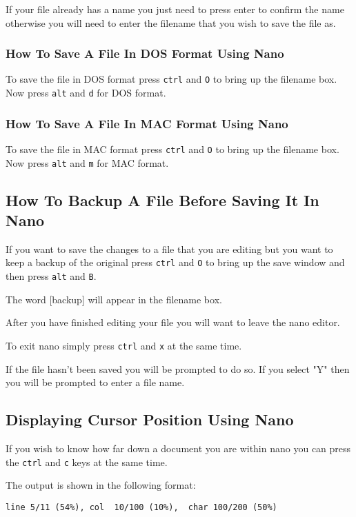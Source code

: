 If your file already has a name you just need to press enter to confirm the name otherwise you will
need to enter the filename that you wish to save the file as.

\subsubsection{How To Save A File In DOS Format Using Nano}
To save the file in DOS format press \texttt{ctrl}  and \texttt{O} to bring up the filename box. Now
press \texttt{alt} and \texttt{d} for DOS format.
\subsubsection{How To Save A File In MAC Format Using Nano}
To save the file in MAC format press \texttt{ctrl}  and \texttt{O} to bring up the filename box. Now
press \texttt{alt} and \texttt{m}  for MAC format.

\subsection{How To Backup A File Before Saving It In Nano}
If you want to save the changes to a file that you are editing but you want to keep a backup of the
original press \texttt{ctrl}  and \texttt{O} to bring up the save window and then press \texttt{alt}
and \texttt{B}.

The word [backup] will appear in the filename box.

After you have finished editing your file you will want to leave the nano editor.

To exit nano simply press \texttt{ctrl}  and \texttt{x} at the same time.

If the file hasn't been saved you will be prompted to do so. If you select "Y" then you will be
prompted to enter a file name.

\subsection{Displaying Cursor Position Using Nano}
If you wish to know how far down a document you are within nano you can press the \texttt{ctrl}  and
\texttt{c} keys at the same time.

The output is shown in the following format:
\begin{lstlisting}
line 5/11 (54%), col  10/100 (10%),  char 100/200 (50%)
\end{lstlisting}

